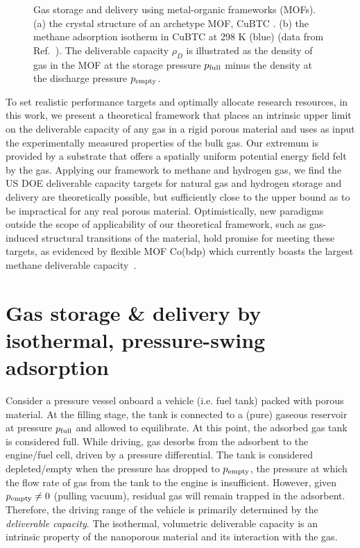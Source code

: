 \begin{figure}
    \centering
    \qquad
    \caption{Gas storage and delivery using metal-organic frameworks (MOFs). (a) the crystal structure of an archetype MOF, CuBTC \cite{chui1999chemically}. (b) the methane adsorption isotherm in CuBTC \cite{chui1999chemically} at 298 K (blue) (data from Ref.~\cite{mason2014evaluating}). The deliverable capacity $\rho_D$ is illustrated as the density of gas in the MOF at the storage pressure $p_{\text{full}}$ minus the density at the discharge pressure $p_{\text{empty}}$.
    }
    \label{fig:fig1}
\end{figure}

To set realistic performance targets and optimally allocate research resources,
in this work, we present a theoretical framework that places an intrinsic upper
limit on the deliverable capacity of any gas in a rigid porous material and
uses as input the experimentally measured properties of the bulk gas. Our
extremum is provided by a substrate that offers a spatially uniform potential
energy field felt by the gas. Applying our framework to methane and hydrogen
gas, we find the US DOE deliverable capacity targets for natural gas and
hydrogen storage and delivery are theoretically possible, but sufficiently
close to the upper bound as to be impractical for any real porous material.
Optimistically, new paradigms outside the scope of applicability of our
theoretical framework, such as gas-induced structural transitions of the
material, hold promise for meeting these targets, as evidenced by flexible MOF
Co(bdp) which currently boasts the largest methane deliverable
capacity~\cite{mason2015methane}.

\section{Gas storage \& delivery by isothermal, pressure-swing adsorption}
Consider a pressure vessel onboard a vehicle (i.e. fuel tank) packed with
porous material. At the filling stage, the tank is connected to a (pure)
gaseous reservoir at pressure $p_{\text{full}}$ and allowed to equilibrate. At this
point, the adsorbed gas tank is considered full. While driving, gas desorbs
from the adsorbent to the engine/fuel cell, driven by a pressure differential.
The tank is considered depleted/empty when the pressure has dropped to
$p_{\text{empty}}$, the pressure at which the flow rate of gas from the tank to the
engine is insufficient. However, given $p_{\text{empty}} \neq 0$ (pulling vacuum),
residual gas will remain trapped in the adsorbent. Therefore, the driving range
of the vehicle is primarily determined by the \emph{deliverable capacity}. The
isothermal, volumetric deliverable capacity is an intrinsic property of the
nanoporous material and its interaction with the gas.

